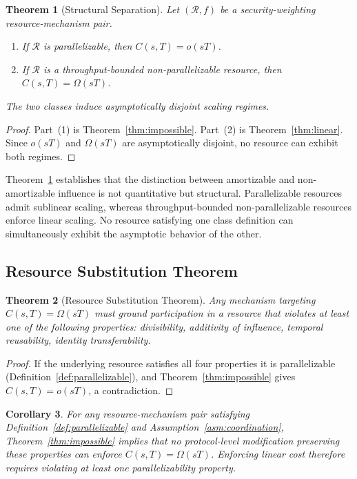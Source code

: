 \documentclass[manuscript,review]{acmart}
\newtheorem{theorem}{Theorem}[section]
\newtheorem{corollary}[theorem]{Corollary}
\theoremstyle{remark}
\begin{document}
	\begin{theorem}[Structural Separation]
		\label{thm:separation}
		Let $(\mathcal{R}, f)$ be a security-weighting
		resource-mechanism pair.
		\begin{enumerate}
			\item If $\mathcal{R}$ is parallelizable, then
			$C(s,T) = o(sT)$.
			\item If $\mathcal{R}$ is a throughput-bounded
			non-parallelizable resource, then
			$C(s,T) = \Omega(sT)$.
		\end{enumerate}
		The two classes induce asymptotically disjoint
		scaling regimes.
	\end{theorem}
	
	\begin{proof}
		Part~(1) is Theorem~\ref{thm:impossible}.
		Part~(2) is Theorem~\ref{thm:linear}.
		Since $o(sT)$ and $\Omega(sT)$ are asymptotically
		disjoint, no resource can exhibit both regimes.
	\end{proof}
	
	Theorem~\ref{thm:separation} establishes that the
	distinction between amortizable and non-amortizable
	influence is not quantitative but structural.
	Parallelizable resources admit sublinear scaling,
	whereas throughput-bounded non-parallelizable resources
	enforce linear scaling.
	No resource satisfying one class definition can
	simultaneously exhibit the asymptotic behavior of
	the other.
	
	\subsection{Resource Substitution Theorem}
	\label{ssec:rsp}
	
	\begin{theorem}[Resource Substitution Theorem]
		\label{thm:substitution}
		Any mechanism targeting $C(s,T) = \Omega(sT)$ must
		ground participation in a resource that violates at
		least one of the following properties:
		divisibility, additivity of influence,
		temporal reusability, identity transferability.
	\end{theorem}
	
	\begin{proof}
		If the underlying resource satisfies all four
		properties it is parallelizable
		(Definition~\ref{def:parallelizable}), and
		Theorem~\ref{thm:impossible} gives
		$C(s,T) = o(sT)$, a contradiction.
	\end{proof}
	
	\begin{corollary}
		\label{cor:protocol}
		For any resource-mechanism pair satisfying
		Definition~\ref{def:parallelizable} and
		Assumption~\ref{asm:coordination},
		Theorem~\ref{thm:impossible} implies that no
		protocol-level modification preserving these
		properties can enforce $C(s,T) = \Omega(sT)$.
		Enforcing linear cost therefore requires violating
		at least one parallelizability property.
	\end{corollary}
	
\end{document}
